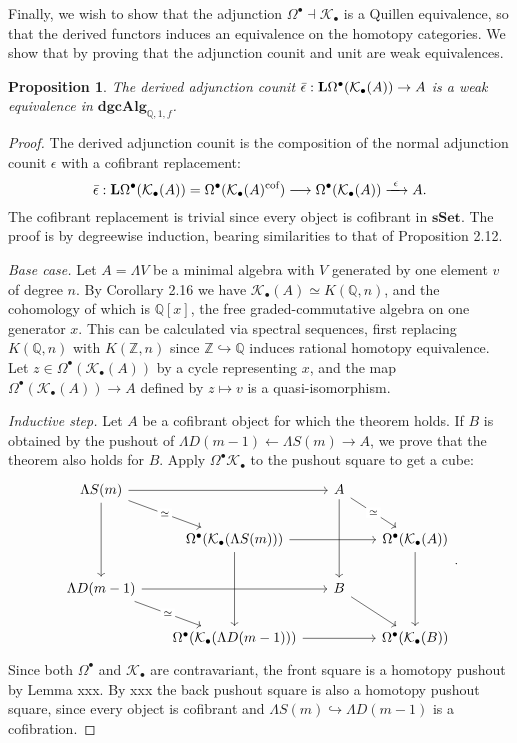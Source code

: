 \documentclass[psamsfonts]{amsart}
\newtheorem{prop}{Proposition}[section]
\theoremstyle{definition}
\newcommand{\Q}{\mathbb{Q}}
\newcommand{\Z}{\mathbb{Z}}
\newcommand{\sSet}{\mathbf{sSet}}
\newcommand{\dgcAlg}{\mathbf{dgcAlg}}
\numberwithin{equation}{section}
\begin{document}
Finally, we wish to show that the adjunction $\Omega^\bullet\dashv\mathcal{K}_\bullet$ is a Quillen equivalence, so that the derived functors induces an equivalence on the homotopy categories. We show that by proving that the adjunction counit and unit are weak equivalences.

\begin{prop}
The derived adjunction counit $\Bar{\epsilon}:\mathbf{L}\Omega^\bullet(\mathcal{K}_\bullet(A))\to A$ is a weak equivalence in $\dgcAlg_{\Q,1,f}$.  
\end{prop}
\begin{proof}

The derived adjunction counit is the composition of the normal adjunction counit $\epsilon$ with a cofibrant replacement:
\[\Bar{\epsilon}:\mathbf{L}\Omega^\bullet(\mathcal{K}_\bullet(A))=\Omega^\bullet(\mathcal{K}_\bullet(A)^\textrm{cof})\longrightarrow\Omega^\bullet(\mathcal{K}_\bullet(A))\xrightarrow{\ \epsilon\ }A.\]
The cofibrant replacement is trivial since every object is cofibrant in $\sSet$. The proof is by degreewise induction, bearing similarities to that of Proposition 2.12.\medbreak

\textit{Base case.} Let $A=\Lambda V$ be a minimal algebra with $V$ generated by one element $v$ of degree $n$. By Corollary 2.16 we have $\mathcal{K}_\bullet(A)\simeq K(\Q,n)$, and the cohomology of which is $\Q[x]$, the free graded-commutative algebra on one generator $x$. This can be calculated via spectral sequences, first replacing $K(\Q,n)$ with $K(\Z,n)$ since $\Z\hookrightarrow\Q$ induces rational homotopy equivalence. Let $z\in\Omega^\bullet(\mathcal{K}_\bullet(A))$ by a cycle representing $x$, and the map $\Omega^\bullet(\mathcal{K}_\bullet(A))\to A$ defined by $z\mapsto v$ is a quasi-isomorphism.\medbreak

\textit{Inductive step.} Let $A$ be a cofibrant object for which the theorem holds. If $B$ is obtained by the pushout of $\Lambda D(m-1)\leftarrow\Lambda S(m)\rightarrow A$, we prove that the theorem also holds for $B$. Apply $\Omega^\bullet\mathcal{K}_\bullet$ to the pushout square to get a cube:
\[\begin{tikzcd}[column sep=scriptsize]
\Lambda S(m)\arrow[rr]\arrow[dr,"\simeq"{description}]\arrow[dd]&& A\arrow[dd]\arrow[dr,"\simeq"{description}]\\
&\Omega^\bullet(\mathcal{K}_\bullet(\Lambda S(m)))\arrow[rr]\arrow[dd]&&\Omega^\bullet(\mathcal{K}_\bullet(A))\arrow[dd]\\
\Lambda D(m-1)\arrow[rr]\arrow[dr,"\simeq"{description}]&& B\arrow[dr]\\
&\Omega^\bullet(\mathcal{K}_\bullet(\Lambda D(m-1)))\arrow[rr]&&\Omega^\bullet(\mathcal{K}_\bullet(B))
\end{tikzcd}.\]
Since both $\Omega^\bullet$ and $\mathcal{K}_\bullet$ are contravariant, the front square is a homotopy pushout by Lemma xxx. By xxx the back pushout square is also a homotopy pushout square, since every object is cofibrant and $\Lambda S(m)\hookrightarrow\Lambda D(m-1)$ is a cofibration.


\end{proof}
\end{document}
